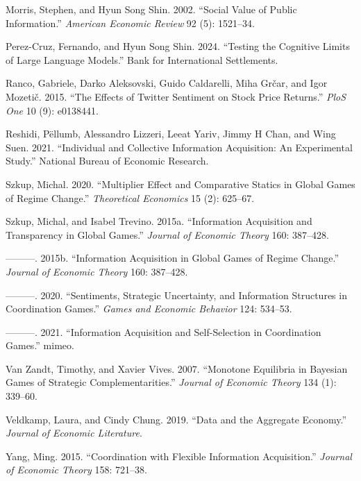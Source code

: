 \documentclass[
]{article}
\newlength{\cslhangindent}
\newenvironment{CSLReferences}[2] %
 {\begin{list}{}{%
  \setlength{\itemindent}{0pt}
  \setlength{\leftmargin}{0pt}
  \setlength{\parsep}{0pt}
  \ifodd #1
   \setlength{\leftmargin}{\cslhangindent}
   \setlength{\itemindent}{-1\cslhangindent}
  \fi
  \setlength{\itemsep}{#2\baselineskip}}}
 {\end{list}}
\theoremstyle{plain}
\theoremstyle{remark}
\begin{document}
\begin{CSLReferences}{1}{0}
Morris, Stephen, and Hyun Song Shin. 2002. {``Social Value of Public
Information.''} \emph{American Economic Review} 92 (5): 1521--34.

Perez-Cruz, Fernando, and Hyun Song Shin. 2024. {``Testing the Cognitive
Limits of Large Language Models.''} Bank for International Settlements.

Ranco, Gabriele, Darko Aleksovski, Guido Caldarelli, Miha Grčar, and
Igor Mozetič. 2015. {``The Effects of Twitter Sentiment on Stock Price
Returns.''} \emph{PloS One} 10 (9): e0138441.

Reshidi, Pëllumb, Alessandro Lizzeri, Leeat Yariv, Jimmy H Chan, and
Wing Suen. 2021. {``Individual and Collective Information Acquisition:
An Experimental Study.''} National Bureau of Economic Research.

Szkup, Michal. 2020. {``Multiplier Effect and Comparative Statics in
Global Games of Regime Change.''} \emph{Theoretical Economics} 15 (2):
625--67.

Szkup, Michal, and Isabel Trevino. 2015a. {``Information Acquisition and
Transparency in Global Games.''} \emph{Journal of Economic Theory} 160:
387--428.

---------. 2015b. {``Information Acquisition in Global Games of Regime
Change.''} \emph{Journal of Economic Theory} 160: 387--428.

---------. 2020. {``Sentiments, Strategic Uncertainty, and Information
Structures in Coordination Games.''} \emph{Games and Economic Behavior}
124: 534--53.

---------. 2021. {``Information Acquisition and Self-Selection in
Coordination Games.''} mimeo.

Van Zandt, Timothy, and Xavier Vives. 2007. {``Monotone Equilibria in
Bayesian Games of Strategic Complementarities.''} \emph{Journal of
Economic Theory} 134 (1): 339--60.

Veldkamp, Laura, and Cindy Chung. 2019. {``Data and the Aggregate
Economy.''} \emph{Journal of Economic Literature}.

Yang, Ming. 2015. {``Coordination with Flexible Information
Acquisition.''} \emph{Journal of Economic Theory} 158: 721--38.

\end{CSLReferences}
\end{document}
